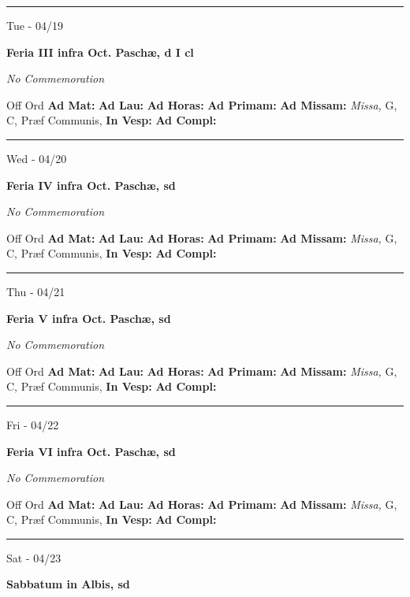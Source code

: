 \documentclass[letterpaper, 10pt]{article}
\begin{document}
\hrule
\begin{center}
Tue - 04/19
\end{center}\textbf{ \large Feria III infra Oct. Paschæ, \textnormal{\normalsize d I cl}}

\textit{No Commemoration}\begin{justify}
Off Ord
\textbf{Ad Mat: }
\textbf{Ad Lau: }
\textbf{Ad Horas: }
\textbf{Ad Primam: }
\textbf{Ad Missam:} \textit{Missa, } G, C, Præf Communis, 
\textbf{In Vesp: }
\textbf{Ad Compl: }\end{justify}



\hrule
\begin{center}
Wed - 04/20
\end{center}\textbf{ \large Feria IV infra Oct. Paschæ, \textnormal{\normalsize sd}}

\textit{No Commemoration}\begin{justify}
Off Ord
\textbf{Ad Mat: }
\textbf{Ad Lau: }
\textbf{Ad Horas: }
\textbf{Ad Primam: }
\textbf{Ad Missam:} \textit{Missa, } G, C, Præf Communis, 
\textbf{In Vesp: }
\textbf{Ad Compl: }\end{justify}



\hrule
\begin{center}
Thu - 04/21
\end{center}\textbf{ \large Feria V infra Oct. Paschæ, \textnormal{\normalsize sd}}

\textit{No Commemoration}\begin{justify}
Off Ord
\textbf{Ad Mat: }
\textbf{Ad Lau: }
\textbf{Ad Horas: }
\textbf{Ad Primam: }
\textbf{Ad Missam:} \textit{Missa, } G, C, Præf Communis, 
\textbf{In Vesp: }
\textbf{Ad Compl: }\end{justify}



\hrule
\begin{center}
Fri - 04/22
\end{center}\textbf{ \large Feria VI infra Oct. Paschæ, \textnormal{\normalsize sd}}

\textit{No Commemoration}\begin{justify}
Off Ord
\textbf{Ad Mat: }
\textbf{Ad Lau: }
\textbf{Ad Horas: }
\textbf{Ad Primam: }
\textbf{Ad Missam:} \textit{Missa, } G, C, Præf Communis, 
\textbf{In Vesp: }
\textbf{Ad Compl: }\end{justify}



\hrule
\begin{center}
Sat - 04/23
\end{center}\textbf{ \large Sabbatum in Albis, \textnormal{\normalsize sd}}
\end{document}
